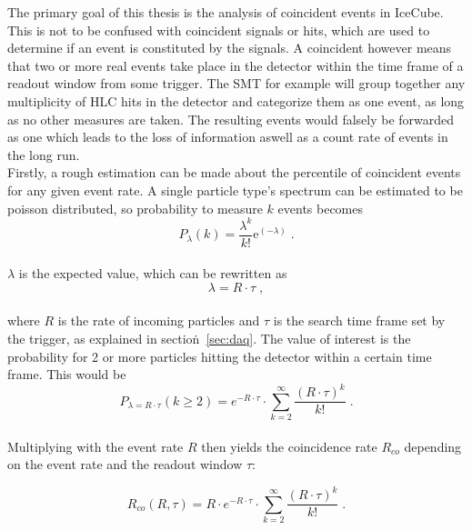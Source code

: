 The primary goal of this thesis is the analysis of coincident events in IceCube. This is not to be confused with coincident signals or hits, which are used 
to determine if an event is constituted by the signals. A coincident however means that two or more real events take place in the detector within the time 
frame of a readout window from some trigger. The SMT for example will group together any multiplicity of HLC hits in the detector and categorize them as one
event, as long as no other measures are taken. The resulting events would falsely be forwarded as one which leads to the loss of information aswell as 
a count rate of events in the long run. \\
Firstly, a rough estimation can be made about the percentile of coincident events for any given event rate. A single particle type's spectrum can be 
estimated to be poisson distributed, so probability to measure $k$ events becomes\\ 

\begin{equation}
    P_{\lambda}(k) = \frac{\lambda^k}{k!}\text{e}^(-\lambda) \; .
\end{equation}\\

$\lambda$ is the expected value, which can be rewritten as \\

\begin{equation}
    \lambda = R \cdot \tau \; ,
\end{equation}\\

where $R$ is the rate of incoming particles and $\tau$ is the search time frame set by the trigger, as explained in section\.~\ref{sec:daq}. 
The value of interest is the probability for 2 or more particles hitting the detector within a certain time frame. This would be \\

\begin{equation}
    P_{\lambda = R\cdot\tau}(k\geq2) = e^{- R\cdot\tau} \cdot \sum_{k=2}^\infty \frac{{(R\cdot\tau)}^k}{k!} \; .
\end{equation}\\ 

Multiplying with the event rate $R$ then yields the coincidence rate $R_{co}$ depending on the event rate and the readout window $\tau$:

\begin{equation}
    R_{co}(R,\tau) = R \cdot e^{- R\cdot\tau} \cdot \sum_{k=2}^\infty \frac{{(R\cdot\tau)}^k}{k!}\;.
\end{equation}\\

